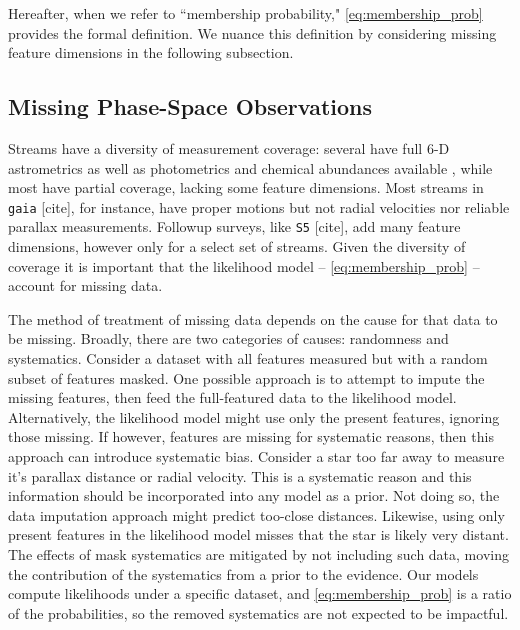 \documentclass[twocolumn]{aastex631}
\newcommand{\dataarchive}[1]{\texttt{#1}}
\newcommand{\gaia}{\dataarchive{gaia}}
\begin{document}
        Hereafter, when we refer to ``membership probability,"
        \autoref{eq:membership_prob} provides the formal definition. We nuance this definition by considering missing feature dimensions in the following subsection.

    \subsection{Missing Phase-Space Observations} \label{sub:missing_data}

        Streams have a diversity of measurement coverage: several have full 6-D astrometrics as well as photometrics and chemical abundances available \citep[e.g.,][]{Koposov2019, 2020A&A...635L...3A, 2022ApJ...928...30L}, while most have partial coverage, lacking some feature dimensions.
        Most streams in \gaia {\color{red} [cite]}, for instance, have proper motions but not radial velocities nor reliable parallax measurements. Followup surveys, like \dataarchive{S5} {\color{red} [cite]}, add many feature dimensions, however only for a select set of streams. Given the diversity of coverage it is important that the likelihood model -- \autoref{eq:membership_prob} -- account for missing data.

        The method of treatment of missing data depends on the cause for that data to be missing.
        Broadly, there are two categories of causes: randomness and systematics.
        Consider a dataset with all features measured but with a random subset of features masked.
        One possible approach is to attempt to impute the missing features, then feed the full-featured data to the likelihood model. Alternatively, the likelihood model might use only the present features, ignoring those missing. If however, features are missing for systematic reasons, then this approach can introduce systematic bias. Consider a star too far away to measure it's parallax distance or radial velocity. This is a systematic reason and this information should be incorporated into any model as a prior. Not doing so, the data imputation approach might predict too-close distances. Likewise, using only present features in the likelihood model misses that the star is likely very distant.
        The effects of mask systematics are mitigated by not including such data,
        moving the contribution of the systematics from a prior to the evidence.
        Our models compute likelihoods under a specific dataset, and \autoref{eq:membership_prob} is a ratio of the probabilities, so the removed systematics are not expected to be impactful.
\end{document}
